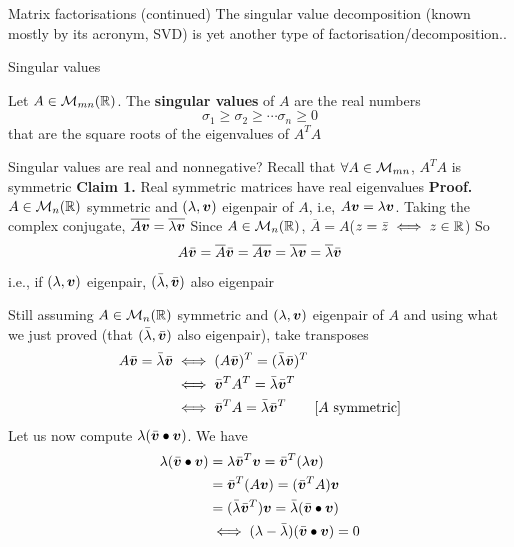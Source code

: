 \documentclass[aspectratio=169]{beamer}\usepackage[]{graphicx}\usepackage[]{xcolor}
\begin{document}

\begin{frame}{Matrix factorisations (continued)}
The singular value decomposition (known mostly by its acronym, SVD) is yet another type of factorisation/decomposition..
\end{frame}

\begin{frame}{Singular values}
\begin{definition}
Let $A\in\mathcal{M}_{mn}(\mathbb{R})$. The \textbf{singular values} of $A$ are the real numbers 
\[
\sigma_1\geq \sigma_2\geq\cdots\sigma_n\geq 0
\]
that are the square roots of the eigenvalues of $A^TA$
\end{definition}
\end{frame}


\begin{frame}{Singular values are real and nonnegative?}
Recall that $\forall A\in\mathcal{M}_{mn}$, $A^TA$ is symmetric
\vfill
\textbf{Claim 1.} Real symmetric matrices have real eigenvalues
\vfill
\textbf{Proof.} $A\in\mathcal{M}_n(\mathbb{R})$ symmetric and $(\lambda,\bm{v})$ eigenpair of $A$, i.e, $A\bm{v}=\lambda\bm{v}$. Taking the complex conjugate, $\overline{A\bm{v}}=\overline{\lambda\bm{v}}$
\vfill
Since $A\in\mathcal{M}_n(\mathbb{R})$, $\overline{A}=A$\qquad ($z=\bar z\iff z\in\mathbb{R}$)
\vfill
So
\[
A\bar{\bm{v}}=\overline{A}\bar{\bm{v}}=\overline{A\bm{v}}=\overline{\lambda\bm{v}}=\overline{\lambda}\bar{\bm{v}}
\]
i.e., if $(\lambda,\bm{v})$ eigenpair, $(\bar\lambda,\bar{\bm{v}})$ also eigenpair
\end{frame}

\begin{frame}
Still assuming $A\in\mathcal{M}_n(\mathbb{R})$ symmetric and $(\lambda,\bm{v})$ eigenpair of $A$ and using what we just proved (that $(\bar\lambda,\bar{\bm{v}})$ also eigenpair), take transposes
\begin{align*}
A\bar{\bm{v}} = \bar\lambda\bar{\bm{v}} &\iff (A\bar{\bm{v}})^T = (\bar\lambda\bar{\bm{v}})^T \\
&\iff \bar{\bm{v}}^TA^T=\bar\lambda\bar{\bm{v}}^T \\
&\iff \bar{\bm{v}}^T A = \bar\lambda\bar{\bm{v}}^T \qquad{\textrm{[$A$ symmetric]}}
\end{align*}
\vfill
Let us now compute $\lambda (\bar{\bm{v}}\bullet\bm{v})$. We have
\begin{align*}
\lambda (\bar{\bm{v}}\bullet\bm{v}) &= \lambda\bar{\bm{v}}^T\bm{v} = \bar{\bm{v}}^T(\lambda\bm{v}) \\
&= \bar{\bm{v}}^T(A\bm{v}) = (\bar{\bm{v}}^TA)\bm{v} \\
&= (\bar\lambda\bar{\bm{v}}^T)\bm{v} = \bar\lambda(\bar{\bm{v}}\bullet\bm{v}) \\
&\iff (\lambda-\bar\lambda)(\bar{\bm{v}}\bullet\bm{v}) = 0
\end{align*}
\end{frame}
\end{document}
